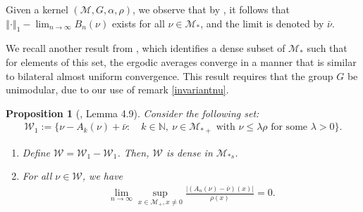 \documentclass[11pt]{amsart}
\newtheorem{prop}[thm]{Proposition}
\theoremstyle{definition}
\theoremstyle{myremark}
\numberwithin{equation}{section}
\def\N{\mathbb N}
\newcommand{\CM}{\mathcal{M}}
\newcommand{\CW}{\mathcal{W}}
\newcommand{\abs}[1]{\left\vert#1\right\vert}
\newcommand{\norm}[1]{\left\Vert#1\right\Vert}
\begin{document}
\noindent Given a kernel $(\CM, G, \alpha, \rho)$, we observe that by , it follows that $\norm{\cdot}_1- \lim_{n \to \infty} B_{n}(\nu)$ exists for all $\nu \in \CM_*$, and the limit is denoted by $\bar{\nu}$. 

\noindent We recall another result from \cite{Bik-Dip-neveu}, which identifies a dense subset of $\CM_*$ such that for elements of this set, the ergodic averages converge in a manner that is similar to bilateral almost uniform convergence. This result requires that the group $G$ be unimodular, due to our use of remark \ref{invariantnu}.
\begin{prop}[\cite{Bik-Dip-neveu}, Lemma 4.9]\label{dense set}
	Consider the following set:
	\begin{align*}
		\CW_1 := \{ \nu - A_{k}(\nu ) + \bar{\nu} : \quad  k \in \N,\  \nu \in \CM_{*+} \text{ with } \nu \leq \lambda \rho \text{ for some } \lambda >0 \}.
	\end{align*}
	\begin{enumerate}\setlength\itemsep{.7em}
		\item[(i)] Define $\CW = \CW_1 - \CW_1$. Then, $\CW$ is dense in $\CM_{* s}$.
		
		\item[(ii)] For all $\nu \in \CW$, we have  
		\begin{align}\label{maximal type}
			\lim_{n \to \infty} \sup_{x \in \CM_+, x \neq 0} \frac{\abs{(A_{n}(\nu)- \bar{\nu})(x)}}{\rho(x)} =0.
		\end{align}
	\end{enumerate}
\end{prop}
\end{document}
